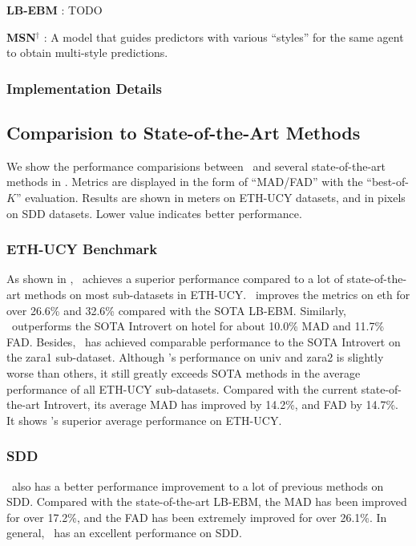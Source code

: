 \documentclass[../paper.tex]{subfiles}
\begin{document}
\textbf{LB-EBM} \cite{pang2021trajectory}:
TODO

\textbf{MSN}$^{\dagger}$ \cite{wong2021msn}:
A model that guides predictors with various ``styles'' for the same agent to obtain multi-style predictions.

\subsubsection{Implementation Details}



\subsection{Comparision to State-of-the-Art Methods}
We show the performance comparisions between \MODEL~and several state-of-the-art methods in .
Metrics are displayed in the form of ``MAD/FAD'' with the ``best-of-$K$'' evaluation\cite{socialGAN,sophie,salzmann2020trajectron}.
Results are shown in meters on ETH-UCY datasets, and in pixels on SDD datasets.
Lower value indicates better performance.

\subsubsection{ETH-UCY Benchmark}
As shown in , \MODEL~achieves a superior performance compared to a lot of state-of-the-art methods on most sub-datasets in ETH-UCY.
\MODEL~improves the metrics on eth for over 26.6\% and 32.6\% compared with the SOTA LB-EBM.
Similarly, \MODEL~outperforms the SOTA Introvert on hotel for about 10.0\% MAD and 11.7\% FAD.
Besides, \MODEL~has achieved comparable performance to the SOTA Introvert on the zara1 sub-dataset.
Although \MODEL's performance on univ and zara2 is slightly worse than others, it still greatly exceeds SOTA methods in the average performance of all ETH-UCY sub-datasets.
Compared with the current state-of-the-art Introvert, its average MAD has improved by 14.2\%, and FAD by 14.7\%.
It shows \MODEL's superior average performance on ETH-UCY.

\subsubsection{SDD}
\MODEL~also has a better performance improvement to a lot of previous methods on SDD.
Compared with the state-of-the-art LB-EBM, the MAD has been improved for over 17.2\%, and the FAD has been extremely improved for over 26.1\%.
In general, \MODEL~has an excellent performance on SDD.
\end{document}
